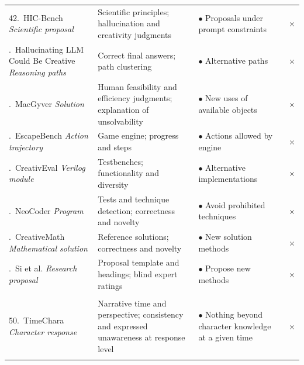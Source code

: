 \documentclass{clv2025}
\newcommand{\Stated}{\ensuremath{\bullet}}
\newcommand{\Lacks}{\ensuremath{\times}}
\begin{document}
\begin{longtable}{@{}P{.26\linewidth}P{.28\linewidth}P{.21\linewidth}P{.20\linewidth}@{}}
42.~HIC-Bench \citep{yang_hicbench_2025}\newline\emph{Scientific proposal} & Scientific principles; hallucination and creativity judgments & \Stated{} Proposals under prompt constraints & \Lacks\\.~Hallucinating LLM Could Be Creative \citep{sun_hallucinating_2024}\newline\emph{Reasoning paths} & Correct final answers; path clustering & \Stated{} Alternative paths & \Lacks\\.~MacGyver \citep{tian_macgyver_2025}\newline\emph{Solution} & Human feasibility and efficiency judgments; explanation of unsolvability & \Stated{} New uses of available objects & \Lacks\\.~EscapeBench \citep{qian_escapebench_2025}\newline\emph{Action trajectory} & Game engine; progress and steps & \Stated{} Actions allowed by engine & \Lacks\\.~CreativEval \citep{delorenzo_creativeval_2024}\newline\emph{Verilog module} & Testbenches; functionality and diversity & \Stated{} Alternative implementations & \Lacks\\.~NeoCoder \citep{lu_benchmarking_2025}\newline\emph{Program} & Tests and technique detection; correctness and novelty & \Stated{} Avoid prohibited techniques & \Lacks\\.~CreativeMath \citep{ye_assessing_2025}\newline\emph{Mathematical solution} & Reference solutions; correctness and novelty & \Stated{} New solution methods & \Lacks\\.~Si et al. \citep{si_ideas_2025}\newline\emph{Research proposal} & Proposal template and headings; blind expert ratings & \Stated{} Propose new methods & \Lacks\\\addlinespace[1pt]
\\*
50.~TimeChara \citep{ahn_timechara_2024}\newline\emph{Character response} & Narrative time and perspective; consistency and expressed unawareness at response level & \Stated{} Nothing beyond character knowledge at a given time & \Lacks\\\addlinespace[1pt]

\end{longtable}
\end{document}
